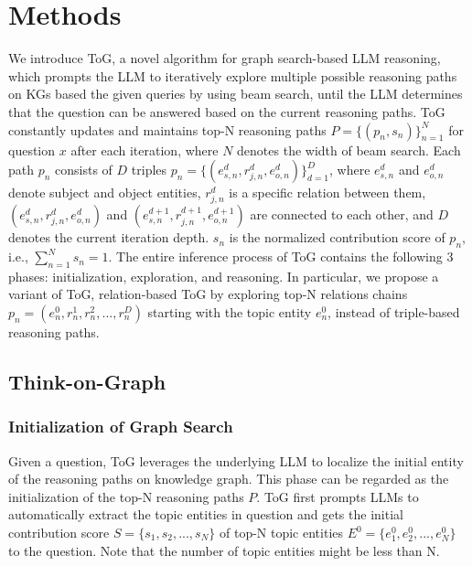 \section{Methods}
\label{sec: methods} 
We introduce ToG, a novel algorithm for graph search-based LLM reasoning, which prompts the LLM to iteratively explore multiple possible reasoning paths on KGs based the given queries by using beam search, until the LLM determines that the question can be answered based on the current reasoning paths. 
ToG constantly updates and maintains top-N reasoning paths $P=\{(p_n,s_n)\}^{N}_{n=1}$ for question $x$ after each iteration, where $N$ denotes the width of beam search. Each path $p_n$ consists of $D$ triples $p_n =\{(e^d_{s,n}, r^d_{j,n}, e^d_{o,n})\}^{D}_{d=1}$, where $e^d_{s,n}$ and $e^d_{o,n}$ denote subject and object entities, $r^d_{j,n}$ is a specific relation between them, $(e^d_{s,n}, r^d_{j,n}, e^d_{o,n})$ and $(e^{d+1}_{s,n}, r^{d+1}_{j,n}, e^{d+1}_{o,n})$  are connected to each other, and $D$ denotes the current iteration depth. $s_n$ is the normalized contribution score of $p_n$, i.e., $\sum_{n=1}^{N} s_n = 1$. The entire inference process of ToG contains the following 3 phases: initialization, exploration, and reasoning. In particular, we propose a variant of ToG, relation-based ToG by exploring top-N relations chains $p_n = (e^{0}_n,r^{1}_n,r^{2}_n,...,r^{D}_n)$ starting with the topic entity $e^{0}_n$, instead of triple-based reasoning paths.

\subsection{Think-on-Graph}

\subsubsection{Initialization of Graph Search}
Given a question, ToG leverages the underlying LLM to localize the initial entity of the reasoning paths on knowledge graph. This phase can be regarded as the initialization of the top-N reasoning paths $P$. 
ToG first prompts LLMs to automatically extract the topic entities in question and gets the initial contribution score $S = \{s_1, s_2,...,s_N\}$ of top-N topic entities $E^{0}=\{e^{0}_{1},e^{0}_{2},...,e^{0}_{N}\}$ to the question. Note that the number of topic entities might be less than N.

